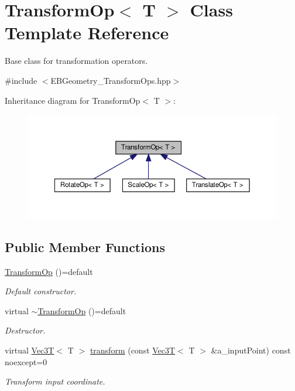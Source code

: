 \hypertarget{classTransformOp}{}\section{Transform\+Op$<$ T $>$ Class Template Reference}
\label{classTransformOp}


Base class for transformation operators.  




{\ttfamily \#include $<$E\+B\+Geometry\+\_\+\+Transform\+Ops.\+hpp$>$}



Inheritance diagram for Transform\+Op$<$ T $>$\+:\nopagebreak
\begin{figure}[H]
\begin{center}
\leavevmode
\includegraphics[width=350pt]{classTransformOp__inherit__graph}
\end{center}
\end{figure}
\subsection*{Public Member Functions}
\begin{DoxyCompactItemize}
\item 
\mbox{\label{classTransformOp_ab904cbdd373ca07e08b254163331b3b4}} 
\hyperlink{classTransformOp_ab904cbdd373ca07e08b254163331b3b4}{Transform\+Op} ()=default
\begin{DoxyCompactList}\small\item\em Default constructor. \end{DoxyCompactList}\item 
\mbox{\label{classTransformOp_a556cc7f5bbe70ce148a0791b883eb58c}} 
virtual \hyperlink{classTransformOp_a556cc7f5bbe70ce148a0791b883eb58c}{$\sim$\+Transform\+Op} ()=default
\begin{DoxyCompactList}\small\item\em Destructor. \end{DoxyCompactList}\item 
virtual \hyperlink{classVec3T}{Vec3T}$<$ T $>$ \hyperlink{classTransformOp_a61c1920daa9f55fd2ea9095cbcfa18b8}{transform} (const \hyperlink{classVec3T}{Vec3T}$<$ T $>$ \&a\+\_\+input\+Point) const noexcept=0
\begin{DoxyCompactList}\small\item\em Transform input coordinate. \end{DoxyCompactList}\end{DoxyCompactItemize}


